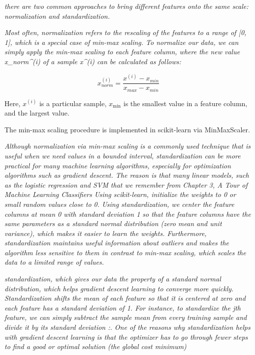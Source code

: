 \textit{there are two common approaches to bring different features onto the same scale: normalization and standardization.}

\textit{Most often, normalization refers to the rescaling of the features to a range of [0, 1], which is a special case of min-max scaling. To normalize our data, we can simply apply the min-max scaling to each feature column, where the new value x_{norm}^{(i)} of a sample x^{(i)} can be calculated as follows:}

\begin{equation} \label{eq:normalization}
    x_{norm}^{(i)} = \frac{x^{(i)} - x_{min}} {x_{max} - x_{min}}
\end{equation}

Here, $x^{(i)}$ is a particular sample, $x_{\min}$ is the smallest value in a feature column, and  the largest value.

The min-max scaling procedure is implemented in scikit-learn via MinMaxScaler.

\textit{Although normalization via min-max scaling is a commonly used technique that is useful when we need values in a bounded interval, standardization can be more practical for many machine learning algorithms, especially for optimization algorithms such as gradient descent. The reason is that many linear models, such as the logistic regression and SVM that we remember from Chapter 3, A Tour of Machine Learning Classifiers Using scikit-learn, initialize the weights to 0 or small random values close to 0. Using standardization, we center the feature columns at mean 0 with standard deviation 1 so that the feature columns have the same parameters as a standard normal distribution (zero mean and unit variance), which makes it easier to learn the weights. Furthermore, standardization maintains useful information about outliers and makes the algorithm less sensitive to them in contrast to min-max scaling, which scales the data to a limited range of values.}

\textit{standardization, which gives our data the property of a standard normal distribution, which helps gradient descent learning to converge more quickly. Standardization shifts the mean of each feature so that it is centered at zero and each feature has a standard deviation of 1. For instance, to standardize the jth feature, we can simply subtract the sample mean  from every training sample and divide it by its standard deviation :. One of the reasons why standardization helps with gradient descent learning is that the optimizer has to go through fewer steps to find a good or optimal solution (the global cost minimum)}

